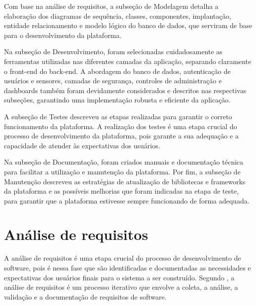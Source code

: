 \documentclass[tcc,capa]{texufpel}
\begin{document}
Com base na análise de requisitos, a subseção de Modelagem detalha a elaboração dos diagramas de sequência, classes, componentes, implantação, entidade relacionamento e modelo lógico do banco de dados, que serviram de base para o desenvolvimento da plataforma.

Na subseção de Desenvolvimento, foram selecionadas cuidadosamente as ferramentas utilizadas nas diferentes camadas da aplicação, separando claramente o front-end do back-end. A abordagem do banco de dados, autenticação de usuários e sensores, camadas de segurança, controles de administração e dashboards também foram devidamente considerados e descritos nas respectivas subseções, garantindo uma implementação robusta e eficiente da aplicação.


A subseção de Testes descreveu as etapas realizadas para garantir o correto funcionamento da plataforma. A realização dos testes é uma etapa crucial do processo de desenvolvimento da plataforma, pois garante a sua adequação e a capacidade de atender às expectativas dos usuários. 

Na subseção de Documentação, foram criados manuais e documentação técnica para facilitar a utilização e manutenção da plataforma. Por fim, a subseção de Manutenção descreveu as estratégias de atualização de bibliotecas e frameworks da plataforma e as possíveis melhorias que foram indicadas na etapa de teste, para garantir que a plataforma estivesse sempre funcionando de forma adequada.

\section{Análise de requisitos}
\label{sec:analiserequisitos}
A análise de requisitos é uma etapa crucial do processo de desenvolvimento de software, pois é nessa fase que são identificadas e documentadas as necessidades e expectativas dos usuários finais para o sistema a ser construído. Segundo \citet{SOMMERVILLE:2011}, a análise de requisitos é um processo iterativo que envolve a coleta, a análise, a validação e a documentação de requisitos de software. 
\end{document}
